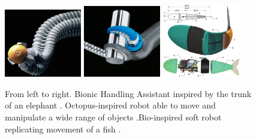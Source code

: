 \begin{figure}[H]       
    \includegraphics[width = 0.3\textwidth]{Figures/Introduction/bhasinasappel.jpg}   
    \hspace{0px}
    \includegraphics[width = 0.3\textwidth]{Figures/Introduction/tentaclegripper.jpg}
    \hspace{0px}
    \includegraphics[width = 0.3\textwidth]{Figures/Introduction/fish.jpg}
    \caption{From left to right. Bionic Handling Assistant inspired by the trunk of an elephant \cite{BHA}. Octopus-inspired robot able to move and manipulate a wide range of objects \cite{octopus}.Bio-inspired soft robot replicating movement of a fish \cite{marchese2014}.}
    \label{fig1:softexample}
\end{figure}

